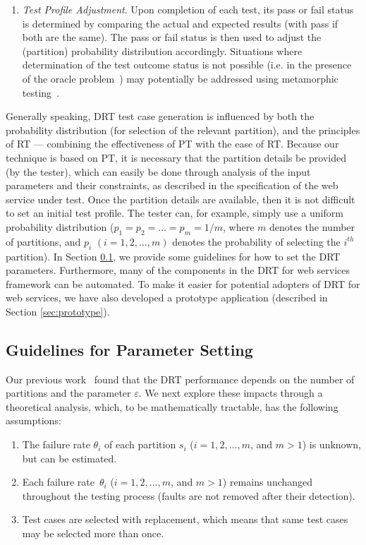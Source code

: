 \documentclass[10pt,journal,compsoc]{IEEEtran}
\begin{document}
\begin{enumerate}[1)]
  \item
  \emph{Test Profile Adjustment}.
  Upon completion of each test, its pass or fail status is determined by comparing the actual and expected results (with pass if both are the same).
  The pass or fail status is then used to adjust the (partition) probability distribution accordingly.
  Situations where determination of the test outcome status is not possible (i.e. in the presence of the oracle problem~\cite{weyuker1982testing, barr2015oracle, patel2018mapping, segura2018metamorphic}) may potentially be addressed using metamorphic testing~\cite{sun2011}.
\end{enumerate}

Generally speaking, DRT test case generation is influenced by both the probability distribution (for selection of the relevant partition), and the principles of RT
---
combining the effectiveness of PT with the ease of RT.
Because our technique is based on PT, it is necessary that the partition details be provided (by the tester), which can easily be done through analysis of the input parameters and their constraints, as described in the specification of the web service under test. Once the partition details are available, then it is not difficult to set an initial test profile. The tester can, for example, simply use a uniform probability distribution ($p_1 = p_2 = \ldots = p_m = 1 / m$, where $m$ denotes the number of partitions, and $p_i $ $(i = 1,2,\ldots,m)$ denotes the probability of selecting the $i^{th}$ partition). In Section \ref{sec:relation}, we provide some guidelines for how to set the DRT parameters.
Furthermore, many of the components in the DRT for web services framework can be automated.
To make it easier for potential adopters of DRT for web services, we have also developed a prototype application (described in Section \ref{sec:prototype}).

\subsection{Guidelines for Parameter Setting}
\label{sec:relation}

Our previous work~\cite{sun2012towards} found that the DRT performance depends on the number of partitions and the parameter $\varepsilon$.
We next explore these impacts through a theoretical analysis, which, to be mathematically tractable, has the following assumptions:

\begin{enumerate}[1)]
  \item
  The failure rate $\theta_i$ of each partition $s_i$ ($i = 1, 2, \ldots, m$, and $m > 1$) is unknown, but can be estimated.

  \item
  Each failure rate~$\theta_i$ ($i = 1, 2, \ldots, m$, and $m > 1$) remains unchanged throughout the testing process (faults are not removed after their detection).

  \item
  Test cases are selected with replacement, which means that same test cases may be selected more than once.
\end{enumerate}
\end{document}
